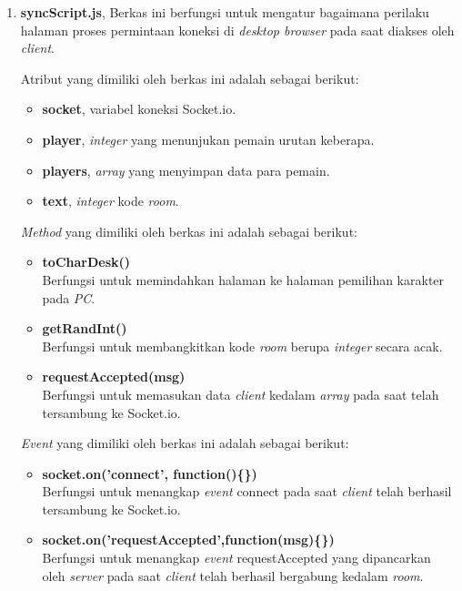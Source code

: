 \begin{enumerate}
\begin{enumerate}
\begin{enumerate}
			\item \textbf{syncScript.js}, Berkas ini berfungsi untuk mengatur bagaimana perilaku halaman proses permintaan koneksi di \textit{desktop browser} pada saat diakses oleh \textit{client}.
			
			Atribut yang dimiliki oleh berkas ini adalah sebagai berikut:
			\begin{itemize}
				\item \textbf{socket}, variabel koneksi Socket.io.
				\item \textbf{player}, \textit{integer} yang menunjukan pemain urutan keberapa.
				\item \textbf{players}, \textit{array} yang menyimpan data para pemain.
				\item \textbf{text}, \textit{integer} kode \textit{room}. 
			\end{itemize}
			
			\textit{Method} yang dimiliki oleh berkas ini adalah sebagai berikut:
			\begin{itemize}
				\item \textbf{toCharDesk()} \\
				Berfungsi untuk memindahkan halaman ke halaman pemilihan karakter pada \textit{PC}.
				
				\item \textbf{getRandInt()} \\
				Berfungsi untuk membangkitkan kode \textit{room} berupa \textit{integer} secara acak.
				
				\item \textbf{requestAccepted(msg)} \\
				Berfungsi untuk memasukan data \textit{client} kedalam \textit{array} pada saat telah tersambung ke Socket.io.
			\end{itemize}
			
			\textit{Event} yang dimiliki oleh berkas ini adalah sebagai berikut:
			\begin{itemize}
				\item \textbf{socket.on('connect', function()\{\})} \\
				Berfungsi untuk menangkap \textit{event} connect pada saat \textit{client} telah berhasil tersambung ke Socket.io.
				
				\item \textbf{socket.on('requestAccepted',function(msg)\{\})} \\
				Berfungsi untuk menangkap \textit{event} requestAccepted yang dipancarkan oleh \textit{server} pada saat \textit{client} telah berhasil bergabung kedalam \textit{room}.
				

\end{itemize}
\end{enumerate}
\end{enumerate}
\end{enumerate}
